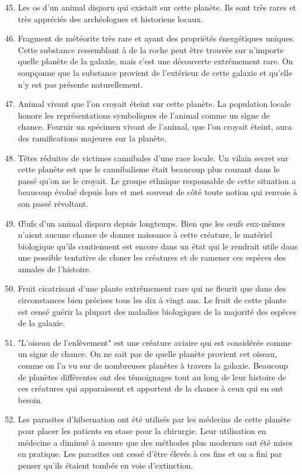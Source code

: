 \documentclass{article}
\begin{document}
\begin{enumerate}
	\setcounter{enumi}{44}
	\item Les os d'un animal disparu qui existait sur cette planète. Ils sont très rares et très appréciés des archéologues et historiens locaux.
	\item Fragment de météorite très rare et ayant des propriétés énergétiques uniques. Cette substance ressemblant à de la roche peut être trouvée sur n'importe quelle planète de la galaxie, mais c'est une découverte extrêmement rare. On soupçonne que la substance provient de l'extérieur de cette galaxie et qu'elle n'y est pas présente naturellement.
	\item Animal vivant que l'on croyait éteint sur cette planète. La population locale honore les représentations symboliques de l'animal comme un signe de chance. Fournir un spécimen vivant de l'animal, que l'on croyait éteint, aura des ramifications majeures sur la planète.
	\item Têtes réduites de victimes cannibales d'une race locale. Un vilain secret sur cette planète est que le cannibalisme était beaucoup plus courant dans le passé qu'on ne le croyait. Le groupe ethnique responsable de cette situation a beaucoup évolué depuis lors et met souvent de côté toute notion qui renvoie à son passé révoltant.
	\item Œufs d'un animal disparu depuis longtemps. Bien que les œufs eux-mêmes n'aient aucune chance de donner naissance à cette créature, le matériel biologique qu'ils contiennent est encore dans un état qui le rendrait utile dans une possible tentative de cloner les créatures et de ramener ces espèces des annales de l'histoire.
	\item Fruit cicatrisant d'une plante extrêmement rare qui ne fleurit que dans des circonstances bien précises tous les dix à vingt ans. Le fruit de cette plante est censé guérir la plupart des maladies biologiques de la majorité des espèces de la galaxie.
	\item "L'oiseau de l'enlèvement" est une créature aviaire qui est considérée comme un signe de chance. On ne sait pas de quelle planète provient cet oiseau, comme on l'a vu sur de nombreuses planètes à travers la galaxie. Beaucoup de planètes différentes ont des témoignages tout au long de leur histoire de ces créatures qui apparaissent et apportent de la chance à ceux qui en ont besoin.
	\item Les parasites d'hibernation ont été utilisés par les médecins de cette planète pour placer les patients en stase pour la chirurgie. Leur utilisation en médecine a diminué à mesure que des méthodes plus modernes ont été mises en pratique. Les parasites ont cessé d'être élevés à ces fins et on a fini par penser qu'ils étaient tombés en voie d'extinction.

\end{enumerate}
\end{document}
